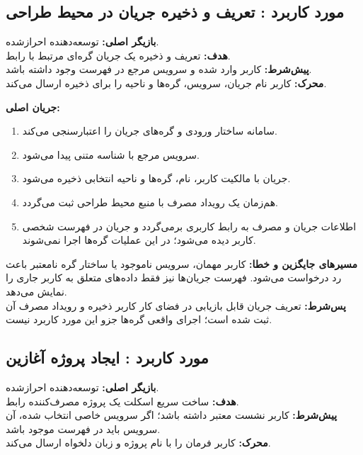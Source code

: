 \UseCaseStart
\subsection{مورد کاربرد : تعریف و ذخیره جریان در محیط طراحی}
\noindent\textbf{بازیگر اصلی:} توسعه‌دهنده احرازشده.\\
\textbf{هدف:} تعریف و ذخیره یک جریان گره‌ای مرتبط با رابط.\\
\textbf{پیش‌شرط:} کاربر وارد شده و سرویس مرجع در فهرست وجود داشته باشد.\\
\textbf{محرک:} کاربر نام جریان، سرویس، گره‌ها و ناحیه را برای ذخیره ارسال می‌کند.


\noindent\textbf{جریان اصلی:}
\begin{enumerate}
  \item سامانه ساختار ورودی و گره‌های جریان را اعتبارسنجی می‌کند.
  \item سرویس مرجع با شناسه متنی پیدا می‌شود.
  \item جریان با مالکیت کاربر، نام، گره‌ها و ناحیه انتخابی ذخیره می‌شود.
  \item هم‌زمان یک رویداد مصرف با منبع محیط طراحی ثبت می‌گردد.
  \item اطلاعات جریان و مصرف به رابط کاربری برمی‌گردد و جریان در فهرست شخصی کاربر دیده می‌شود؛ در این عملیات گره‌ها اجرا نمی‌شوند.
\end{enumerate}

\noindent\textbf{مسیرهای جایگزین و خطا:}
کاربر مهمان، سرویس ناموجود یا ساختار گره نامعتبر باعث رد درخواست می‌شود. فهرست جریان‌ها نیز فقط داده‌های متعلق به کاربر جاری را نمایش می‌دهد.\\
\textbf{پس‌شرط:} تعریف جریان قابل بازیابی در فضای کار کاربر ذخیره و رویداد مصرف آن ثبت شده است؛ اجرای واقعی گره‌ها جزو این مورد کاربرد نیست.

\UseCaseStart
\subsection{مورد کاربرد : ایجاد پروژه آغازین}
\noindent\textbf{بازیگر اصلی:} توسعه‌دهنده احرازشده.\\
\textbf{هدف:} ساخت سریع اسکلت یک پروژه مصرف‌کننده رابط.\\
\textbf{پیش‌شرط:} کاربر نشست معتبر داشته باشد؛ اگر سرویس خاصی انتخاب شده، آن سرویس باید در فهرست موجود باشد.\\
\textbf{محرک:} کاربر فرمان  را با نام پروژه و زبان دلخواه ارسال می‌کند.

